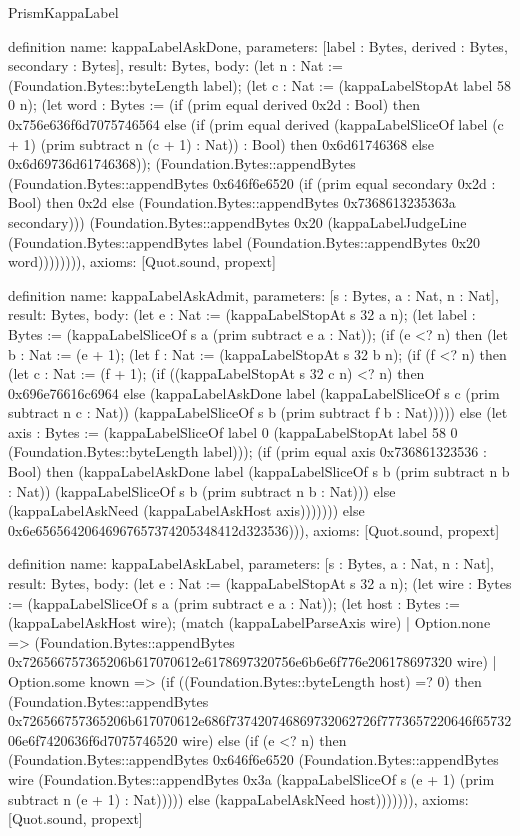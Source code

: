 \begin{lexlean}{PrismKappaLabel}
\begin{semanticmodule}
definition{
  name: kappaLabelAskDone,
  parameters: [label : Bytes, derived : Bytes, secondary : Bytes],
  result: Bytes,
  body: (let n : Nat := (Foundation.Bytes::byteLength label); (let c : Nat := (kappaLabelStopAt label 58 0 n); (let word : Bytes := (if (prim equal derived 0x2d : Bool) then 0x756e636f6d7075746564 else (if (prim equal derived (kappaLabelSliceOf label (c + 1) (prim subtract n (c + 1) : Nat)) : Bool) then 0x6d61746368 else 0x6d69736d61746368)); (Foundation.Bytes::appendBytes (Foundation.Bytes::appendBytes 0x646f6e6520 (if (prim equal secondary 0x2d : Bool) then 0x2d else (Foundation.Bytes::appendBytes 0x7368613235363a secondary))) (Foundation.Bytes::appendBytes 0x20 (kappaLabelJudgeLine (Foundation.Bytes::appendBytes label (Foundation.Bytes::appendBytes 0x20 word)))))))),
  axioms: [Quot.sound, propext]
}

definition{
  name: kappaLabelAskAdmit,
  parameters: [s : Bytes, a : Nat, n : Nat],
  result: Bytes,
  body: (let e : Nat := (kappaLabelStopAt s 32 a n); (let label : Bytes := (kappaLabelSliceOf s a (prim subtract e a : Nat)); (if (e <? n) then (let b : Nat := (e + 1); (let f : Nat := (kappaLabelStopAt s 32 b n); (if (f <? n) then (let c : Nat := (f + 1); (if ((kappaLabelStopAt s 32 c n) <? n) then 0x696e76616c6964 else (kappaLabelAskDone label (kappaLabelSliceOf s c (prim subtract n c : Nat)) (kappaLabelSliceOf s b (prim subtract f b : Nat))))) else (let axis : Bytes := (kappaLabelSliceOf label 0 (kappaLabelStopAt label 58 0 (Foundation.Bytes::byteLength label))); (if (prim equal axis 0x736861323536 : Bool) then (kappaLabelAskDone label (kappaLabelSliceOf s b (prim subtract n b : Nat)) (kappaLabelSliceOf s b (prim subtract n b : Nat))) else (kappaLabelAskNeed (kappaLabelAskHost axis))))))) else 0x6e65656420646967657374205348412d323536))),
  axioms: [Quot.sound, propext]
}

definition{
  name: kappaLabelAskLabel,
  parameters: [s : Bytes, a : Nat, n : Nat],
  result: Bytes,
  body: (let e : Nat := (kappaLabelStopAt s 32 a n); (let wire : Bytes := (kappaLabelSliceOf s a (prim subtract e a : Nat)); (let host : Bytes := (kappaLabelAskHost wire); (match (kappaLabelParseAxis wire)
    | Option.none => (Foundation.Bytes::appendBytes 0x726566757365206b617070612e6178697320756e6b6e6f776e206178697320 wire)
    | Option.some known => (if ((Foundation.Bytes::byteLength host) =? 0) then (Foundation.Bytes::appendBytes 0x726566757365206b617070612e686f737420746869732062726f7773657220646f6573206e6f7420636f6d7075746520 wire) else (if (e <? n) then (Foundation.Bytes::appendBytes 0x646f6e6520 (Foundation.Bytes::appendBytes wire (Foundation.Bytes::appendBytes 0x3a (kappaLabelSliceOf s (e + 1) (prim subtract n (e + 1) : Nat))))) else (kappaLabelAskNeed host))))))),
  axioms: [Quot.sound, propext]
}


\end{semanticmodule}
\end{lexlean}
